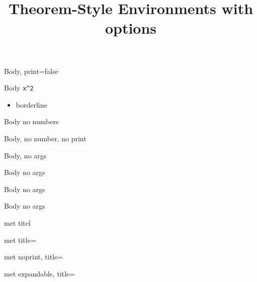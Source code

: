 \documentclass{ximera}
\begin{document}
\title{Theorem-Style Environments with options}{}
\begin{abstract}\end{abstract}
\maketitle

\ifdefined\HCode
\newcommand{\nl}{}
\else
\newcommand{\nl}{\ \par} %
\fi



\theoremstyle{indented}


\begin{BoxI}[Veelterm,print=false]
  Body, print=false
\end{BoxI}
\begin{BoxI}[Veelterm]
Body  \verb|x^2|
\begin{itemize}
\item borderline
\end{itemize}
\end{BoxI}

\begin{BoxI}[title={Veelterm, not numbered},nonumbered]
Body no numbers
\end{BoxI}

\begin{BoxI}[title={Veelterm, not numbered not printed},noprint,nonumbered]
Body, no number, no print
\end{BoxI}

\begin{BoxI}
Body, no args
\end{BoxI}


\begin{definition}
Body no args
\end{definition}

\begin{proposition}
Body no args
\end{proposition}

\begin{prop}   Body no args  \end{prop}
\begin{prop}   met titel  \end{prop}
\begin{prop}[title=Stelling van Euclides]   met title=  \end{prop}
\begin{prop}[title=Stelling van Euclides,noprint]   met noprint, title=  \end{prop}
\begin{prop}[title=Stelling van Euclides,expandable]   met expandable, title=  \end{prop}
\end{document}
